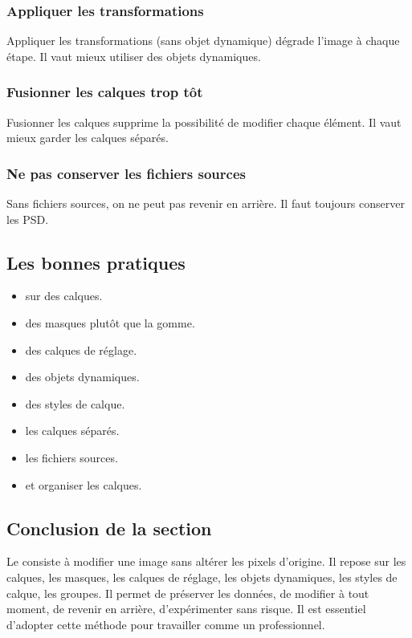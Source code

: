 \subsubsection{Appliquer les transformations}

Appliquer les transformations (sans objet dynamique) dégrade l'image à chaque étape. Il vaut mieux utiliser des objets dynamiques.

\subsubsection{Fusionner les calques trop tôt}

Fusionner les calques supprime la possibilité de modifier chaque élément. Il vaut mieux garder les calques séparés.

\subsubsection{Ne pas conserver les fichiers sources}

Sans fichiers sources, on ne peut pas revenir en arrière. Il faut toujours conserver les PSD.

\subsection{Les bonnes pratiques}

\begin{itemize}
    \item {} sur des calques.
    \item {} des masques plutôt que la gomme.
    \item {} des calques de réglage.
    \item {} des objets dynamiques.
    \item {} des styles de calque.
    \item {} les calques séparés.
    \item {} les fichiers sources.
    \item {} et organiser les calques.
\end{itemize}

\subsection*{Conclusion de la section}

Le  consiste à modifier une image sans altérer les pixels d'origine. Il repose sur les calques, les masques, les calques de réglage, les objets dynamiques, les styles de calque, les groupes. Il permet de préserver les données, de modifier à tout moment, de revenir en arrière, d'expérimenter sans risque. Il est essentiel d'adopter cette méthode pour travailler comme un professionnel.

